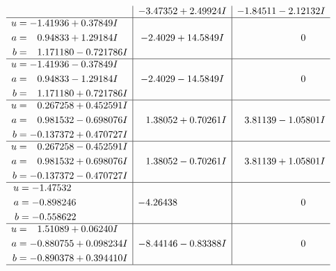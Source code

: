 \documentclass[1p]{elsarticle_modified}
\theoremstyle{definition}
\begin{document}
$$\begin{array}{c|c|c}
 & -3.47352 + 2.49924 I & -1.84511 - 2.12132 I \\ \hline\begin{aligned}
u &= -1.41936 + 0.37849 I \\
a &= \phantom{-}0.94833 + 1.29184 I \\
b &= \phantom{-}1.171180 - 0.721786 I\end{aligned}
 & -2.4029 + 14.5849 I & \phantom{-0.000000 } 0 \\ \hline\begin{aligned}
u &= -1.41936 - 0.37849 I \\
a &= \phantom{-}0.94833 - 1.29184 I \\
b &= \phantom{-}1.171180 + 0.721786 I\end{aligned}
 & -2.4029 - 14.5849 I & \phantom{-0.000000 } 0 \\ \hline\begin{aligned}
u &= \phantom{-}0.267258 + 0.452591 I \\
a &= \phantom{-}0.981532 - 0.698076 I \\
b &= -0.137372 + 0.470727 I\end{aligned}
 & \phantom{-}1.38052 + 0.70261 I & \phantom{-}3.81139 - 1.05801 I \\ \hline\begin{aligned}
u &= \phantom{-}0.267258 - 0.452591 I \\
a &= \phantom{-}0.981532 + 0.698076 I \\
b &= -0.137372 - 0.470727 I\end{aligned}
 & \phantom{-}1.38052 - 0.70261 I & \phantom{-}3.81139 + 1.05801 I \\ \hline\begin{aligned}
u &= -1.47532\phantom{ +0.000000I} \\
a &= -0.898246\phantom{ +0.000000I} \\
b &= -0.558622\phantom{ +0.000000I}\end{aligned}
 & -4.26438\phantom{ +0.000000I} & \phantom{-0.000000 } 0 \\ \hline\begin{aligned}
u &= \phantom{-}1.51089 + 0.06240 I \\
a &= -0.880755 + 0.098234 I \\
b &= -0.890378 + 0.394410 I\end{aligned}
 & -8.44146 - 0.83388 I & \phantom{-0.000000 } 0\\
 \hline 
 \end{array}$$\newpage$$\begin{array}{c|c|c}  

\end{array}$$
\end{document}

